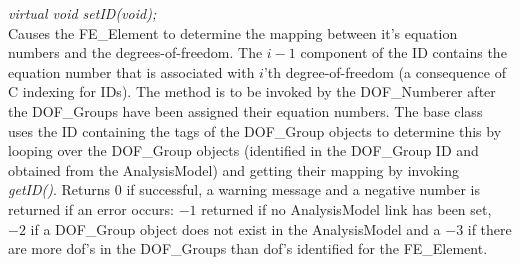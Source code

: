 {\em virtual void setID(void);} \\
Causes the FE\_Element to determine the mapping between it's equation
numbers and the degrees-of-freedom. The $i-1$ component of the ID
contains the equation number that is associated with $i$'th
degree-of-freedom (a consequence of C indexing for IDs). The method is
to be invoked by the DOF\_Numberer after the DOF\_Groups have been assigned
their equation numbers. The base class uses the ID containing the tags of
the DOF\_Group objects to determine this by looping over the
DOF\_Group objects (identified in the DOF\_Group ID and obtained from
the AnalysisModel) and getting their mapping by invoking {\em
getID()}. Returns $0$ if successful, a warning message and a
negative number is returned if an error occurs:
$-1$ returned if no AnalysisModel link has been set, $-2$ if a
DOF\_Group object does not exist in the AnalysisModel and a $-3$ if
there are more dof's in the DOF\_Groups than dof's identified for the
FE\_Element. \\


